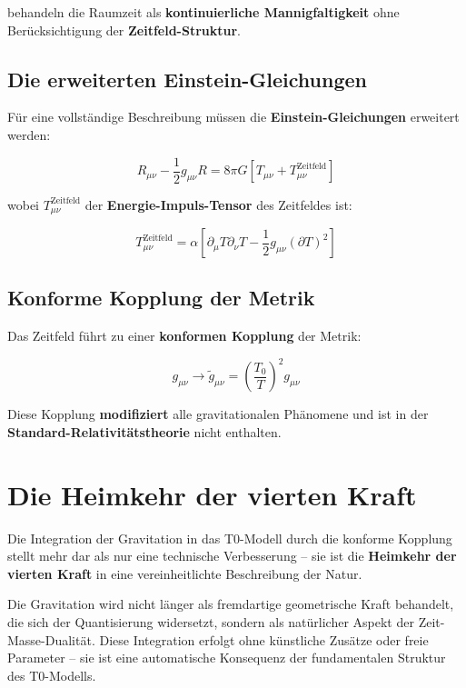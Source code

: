 \documentclass[12pt,a4paper]{report}
\begin{document}
behandeln die Raumzeit als \textbf{kontinuierliche Mannigfaltigkeit} ohne Berücksichtigung der \textbf{Zeitfeld-Struktur}.

\subsection{Die erweiterten Einstein-Gleichungen}

Für eine vollständige Beschreibung müssen die \textbf{Einstein-Gleichungen} erweitert werden:

\begin{equation}
	R_{\mu\nu} - \frac{1}{2}g_{\mu\nu}R = 8\pi G[T_{\mu\nu} + T_{\mu\nu}^{\text{Zeitfeld}}]
\end{equation}

wobei $T_{\mu\nu}^{\text{Zeitfeld}}$ der \textbf{Energie-Impuls-Tensor} des Zeitfeldes ist:

\begin{equation}
	T_{\mu\nu}^{\text{Zeitfeld}} = \alpha[\partial_\mu T \partial_\nu T - \frac{1}{2}g_{\mu\nu}(\partial T)^2]
\end{equation}

\subsection{Konforme Kopplung der Metrik}

Das Zeitfeld führt zu einer \textbf{konformen Kopplung} der Metrik:

\begin{equation}
	g_{\mu\nu} \to \tilde{g}_{\mu\nu} = \left(\frac{T_0}{T}\right)^2 g_{\mu\nu}
\end{equation}

Diese Kopplung \textbf{modifiziert} alle gravitationalen Phänomene und ist in der \textbf{Standard-Relativitätstheorie} nicht enthalten.

\section{Die Heimkehr der vierten Kraft}

Die Integration der Gravitation in das T0-Modell durch die konforme Kopplung stellt mehr dar als nur eine technische Verbesserung -- sie ist die \textbf{Heimkehr der vierten Kraft} in eine vereinheitlichte Beschreibung der Natur. 

Die Gravitation wird nicht länger als fremdartige geometrische Kraft behandelt, die sich der Quantisierung widersetzt, sondern als natürlicher Aspekt der Zeit-Masse-Dualität. Diese Integration erfolgt ohne künstliche Zusätze oder freie Parameter -- sie ist eine automatische Konsequenz der fundamentalen Struktur des T0-Modells.
\end{document}
